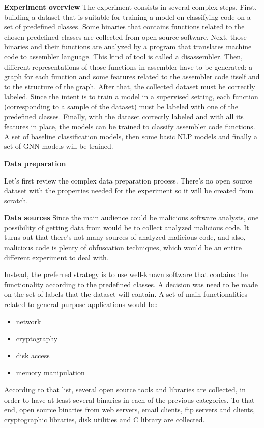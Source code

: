 \textbf{Experiment overview}
The experiment consists in several complex steps.
First, building a dataset that is suitable for training a model on classifying code on a set of predefined classes. Some binaries that contains functions related to the chosen predefined classes are collected from open source software.  
Next, those binaries and their functions are analyzed by a program that translates machine code to assembler language. This kind of tool is called a disassembler.
Then, different representations of those functions in assembler have to be generated: a graph for each function and some features related to the assembler code itself and to the structure of the graph.
After that, the collected dataset must be correctly labeled. Since the intent is to train a model in a supervised setting, each function (corresponding to a sample of the dataset) must be labeled with one of the predefined classes.
Finally, with the dataset correctly labeled and with all its features in place, the models can be trained to classify assembler code functions. A set of baseline classification models, then some basic NLP models and finally a set of GNN models will be trained. 


\textbf{Data preparation}

Let's first review the complex data preparation process. There's no open source dataset with the properties needed for the experiment so it will be created from scratch.



\textbf{Data sources}
Since the main audience could be malicious software analysts, one possibility of getting data from would be to collect analyzed malicious code. It turns out that there's not many sources of analyzed malicious code, and also, malicious code is plenty of obfuscation techniques, which would be an entire different experiment to deal with. 

Instead, the preferred strategy is to use well-known software that contains the functionality according to the predefined classes. A decision was need to be made on the set of labels that the dataset will contain. A set of main functionalities related to general purpose applications would be:
\begin{itemize}
	\item network
	\item cryptography
	\item disk access
	\item memory manipulation
\end{itemize}
According to that list, several open source tools and libraries are collected, in order to have at least several binaries in each of the previous categories. To that end, open source binaries from web servers, email clients, ftp servers and clients, cryptographic libraries, disk utilities and C library are collected.





